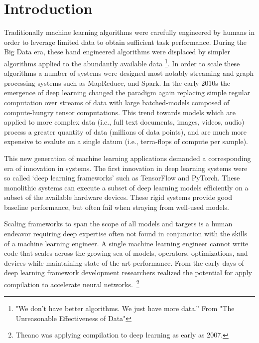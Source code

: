 \chapter{Introduction}
\label{ch:intro}

Traditionally machine learning algorithms were carefully engineered by humans
  in order to leverage limited data to obtain sufficient task performance.
During the Big Data era, these hand engineered algorithms were displaced by
  simpler algorithms applied to the abundantly available data
  \footnote{"We don’t have better algorithms. We just have more data.” From "The Unreasonable Effectiveness of Data"}.
In order to scale these algorithms a number of systems were
  designed most notably streaming and graph processing systems such as MapReduce, and Spark.
In the early 2010s the emergence of deep learning changed the paradigm again
  replacing simple regular computation over streams of data with large batched-models
  composed of compute-hungry tensor computations.
This trend towards models which are applied to more complex data (i.e., full text documents, images, videos, audio)
  process a greater quantity of data (millions of data points), and are much more expensive to evalute
  on a single datum (i.e., terra-flops of compute per sample).

This new generation of machine learning applications demanded a corresponding era of
  innovation in systems.
The first innovation in deep learning systems were so called
  ‘deep learning frameworks’ such as TensorFlow and PyTorch.
These monolithic systems can execute a subset of deep learning models
  efficiently on a subset of the available hardware devices.
These rigid systems provide good baseline performance, but often fail
  when straying from well-used models.

Scaling frameworks to span the scope of all models and targets is a human endeavor
  requiring deep expertise often not found in conjunction with the skills of a
  machine learning engineer.
A single machine learning engineer cannot write code that scales across the growing
  sea of models, operators, optimizations, and devices while maintaining state-of-the-art
  performance.
From the early days of deep learning framework development researchers realized the
  potential for apply compilation to accelerate neural networks.~\footnote{Theano was applying
  compilation to deep learning as early as 2007.}

